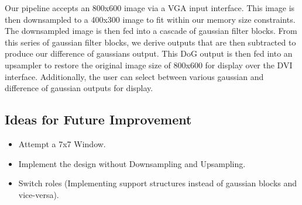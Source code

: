 Our pipeline accepts an 800x600 image via a VGA input interface. This image 
is then downsampled to a 400x300 image to fit within our memory size constraints. 
The downsampled image is then fed into a cascade of gaussian filter blocks. From this
series of gaussian filter blocks, we derive outputs that are then subtracted to 
produce our difference of gaussians output. This DoG output is then fed into 
an upsampler to restore the original image size of 800x600 for display over
the DVI interface. Additionally, the user can select between various gaussian and 
difference of gaussian outputs for display.

\subsection{Ideas for Future Improvement}

\begin{itemize}\itemsep0em
    \item Attempt a 7x7 Window.
    \item Implement the design without Downsampling and Upsampling.
    \item Switch roles (Implementing support structures instead of gaussian blocks and vice-versa).
\end{itemize}


